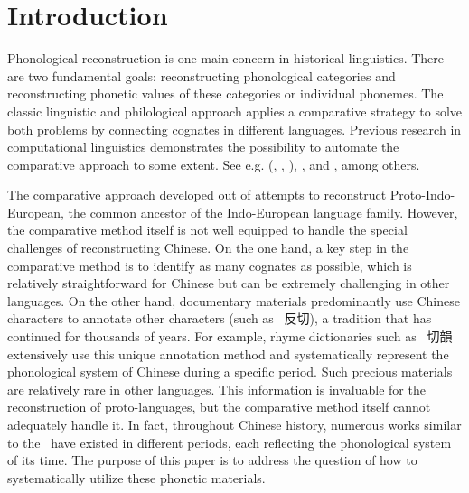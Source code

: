 \section{Introduction}
Phonological reconstruction is one main concern in historical linguistics. 
There are two fundamental goals: reconstructing phonological categories and reconstructing phonetic values of these categories or individual phonemes. 
The classic linguistic and philological approach applies a comparative strategy to solve both problems by connecting cognates in different languages.
Previous research in computational linguistics demonstrates the possibility to automate the comparative approach to some extent.
See e.g. \citeauthor{bouchard-2007a} (\citeyear{bouchard-2007a}, \citeyear{bouchard-2009}, \citeyear{bouchard-2013}), \citet{list-etal-2022-new}, and \citet{he-etal-2023-neural}, among others. 


The comparative approach developed out of attempts to reconstruct Proto-Indo-European, the common ancestor of the Indo-European language family.
However, the comparative method itself is not well equipped to handle the special challenges of reconstructing Chinese. 
On the one hand, a key step in the comparative method is to identify as many cognates as possible, which is relatively straightforward for Chinese but can be extremely challenging in other languages.
On the other hand, documentary materials predominantly use Chinese characters to annotate other characters (such as \fq~反切), a tradition that has continued for thousands of years. 
For example, rhyme dictionaries such as \qy~切韻 extensively use this unique annotation method and systematically represent the phonological system of Chinese during a specific period. 
Such precious materials are relatively rare in other languages. 
This information is invaluable for the reconstruction of proto-languages, but the comparative method itself cannot adequately handle it. 
In fact, throughout Chinese history, numerous works similar to the \qy~have existed in different periods, each reflecting the phonological system of its time.
The purpose of this paper is to address the question of how to systematically utilize these phonetic materials.
    
